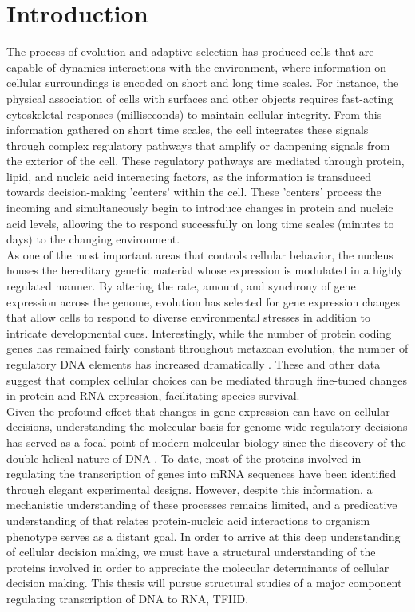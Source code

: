 \chapter{Introduction}

\indent The process of evolution and adaptive selection has produced cells that are capable of dynamics interactions with the environment, where information on cellular surroundings is encoded on short and long time scales. For instance, the physical association of cells with surfaces and other objects requires fast-acting cytoskeletal responses (milliseconds) to maintain cellular integrity. From this information gathered on short time scales, the cell integrates these signals through complex regulatory pathways that amplify or dampening signals from the exterior of the cell. These regulatory pathways are mediated through protein, lipid, and nucleic acid interacting factors, as the information is transduced towards decision-making 'centers' within the cell.  These 'centers' process the incoming and simultaneously begin to introduce changes in protein and nucleic acid levels, allowing the to respond successfully on long time scales (minutes to days) to the changing environment.\\
\indent As one of the most important areas that controls cellular behavior, the nucleus houses the hereditary genetic material whose expression is modulated in a highly regulated manner. By altering the rate, amount, and synchrony of gene expression across the genome, evolution has selected for gene expression changes that allow cells to respond to diverse environmental stresses in addition to intricate developmental cues. Interestingly, while the number of protein coding genes has remained fairly constant throughout metazoan evolution, the number of regulatory DNA elements has increased dramatically \cite{Levine_1710}. These and other data suggest that complex cellular choices can be mediated through fine-tuned changes in protein and RNA expression, facilitating species survival. \\
\indent Given the profound effect that changes in gene expression can have on cellular decisions, understanding the molecular basis for genome-wide regulatory decisions has served as a focal point of modern molecular biology since the discovery of the double helical nature of DNA \cite{Watson_4017}. To date, most of the proteins involved in regulating the transcription of genes into mRNA sequences have been identified through elegant experimental designs.  However, despite this information, a mechanistic understanding of these processes remains limited, and a predicative understanding of that relates protein-nucleic acid interactions to organism phenotype serves as a distant goal. In order to arrive at this deep understanding of cellular decision making, we must have a structural understanding of the proteins involved in order to appreciate the molecular determinants of cellular decision making. This thesis will pursue structural studies of a major component regulating transcription of DNA to RNA, TFIID.

